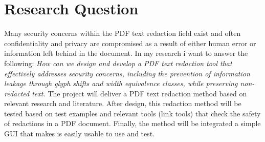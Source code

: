 \section{Research Question}

Many security concerns within the PDF text redaction field exist and often confidentiality and privacy are compromised as a result of either human error or information left behind in the document. In my research i want to answer the following: \textit{How can we design and develop a PDF text redaction tool that effectively addresses security concerns, including the prevention of information leakage through glyph shifts and width equivalence classes, while preserving non-redacted text.} The project will deliver a PDF text redaction method based on relevant research and literature. After design, this redaction method will be tested based on test examples and relevant tools (link tools) that check the safety of redactions in a PDF document. Finally, the method will be integrated a simple GUI that makes is easily usable to use and test. 